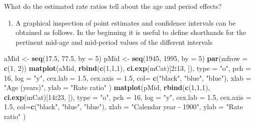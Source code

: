 \documentclass[
]{book}
\newenvironment{Shaded}{\begin{snugshade}}{\end{snugshade}}
\newcommand{\AttributeTok}[1]{\textcolor[rgb]{0.13,0.29,0.53}{#1}}
\newcommand{\DecValTok}[1]{\textcolor[rgb]{0.00,0.00,0.81}{#1}}
\newcommand{\FloatTok}[1]{\textcolor[rgb]{0.00,0.00,0.81}{#1}}
\newcommand{\FunctionTok}[1]{\textcolor[rgb]{0.13,0.29,0.53}{\textbf{#1}}}
\newcommand{\NormalTok}[1]{#1}
\newcommand{\OtherTok}[1]{\textcolor[rgb]{0.56,0.35,0.01}{#1}}
\newcommand{\SpecialCharTok}[1]{\textcolor[rgb]{0.81,0.36,0.00}{\textbf{#1}}}
\newcommand{\StringTok}[1]{\textcolor[rgb]{0.31,0.60,0.02}{#1}}
\providecommand{\tightlist}{%
  \setlength{\itemsep}{0pt}\setlength{\parskip}{0pt}}
\begin{document}
What do the estimated rate ratios tell about the age and period effects?

\begin{enumerate}
\def\labelenumi{\arabic{enumi}.}
\setcounter{enumi}{1}
\tightlist
\item
  A graphical inspection of point estimates and confidence
  intervals can be obtained as follows. In the beginning it is useful
  to define shorthands for the pertinent mid-age and mid-period values
  of the different intervals
\end{enumerate}

\begin{Shaded}
\begin{Highlighting}[]
\NormalTok{aMid }\OtherTok{\textless{}{-}} \FunctionTok{seq}\NormalTok{(}\FloatTok{17.5}\NormalTok{, }\FloatTok{77.5}\NormalTok{, }\AttributeTok{by =} \DecValTok{5}\NormalTok{)}
\NormalTok{pMid }\OtherTok{\textless{}{-}} \FunctionTok{seq}\NormalTok{(}\DecValTok{1945}\NormalTok{, }\DecValTok{1995}\NormalTok{, }\AttributeTok{by =} \DecValTok{5}\NormalTok{)}
\FunctionTok{par}\NormalTok{(}\AttributeTok{mfrow =} \FunctionTok{c}\NormalTok{(}\DecValTok{1}\NormalTok{, }\DecValTok{2}\NormalTok{))}
\FunctionTok{matplot}\NormalTok{(aMid, }\FunctionTok{rbind}\NormalTok{(}\FunctionTok{c}\NormalTok{(}\DecValTok{1}\NormalTok{,}\DecValTok{1}\NormalTok{,}\DecValTok{1}\NormalTok{), }\FunctionTok{ci.exp}\NormalTok{(mCat)[}\DecValTok{2}\SpecialCharTok{:}\DecValTok{13}\NormalTok{, ]), }\AttributeTok{type =} \StringTok{"o"}\NormalTok{, }\AttributeTok{pch =} \DecValTok{16}\NormalTok{,     }
   \AttributeTok{log =} \StringTok{"y"}\NormalTok{, }\AttributeTok{cex.lab =} \FloatTok{1.5}\NormalTok{, }\AttributeTok{cex.axis =} \FloatTok{1.5}\NormalTok{, }\AttributeTok{col=} \FunctionTok{c}\NormalTok{(}\StringTok{"black"}\NormalTok{, }\StringTok{"blue"}\NormalTok{, }\StringTok{"blue"}\NormalTok{),}
  \AttributeTok{xlab =} \StringTok{"Age (years)"}\NormalTok{, }\AttributeTok{ylab =} \StringTok{"Rate ratio"}\NormalTok{ )}
\FunctionTok{matplot}\NormalTok{(pMid, }\FunctionTok{rbind}\NormalTok{(}\FunctionTok{c}\NormalTok{(}\DecValTok{1}\NormalTok{,}\DecValTok{1}\NormalTok{,}\DecValTok{1}\NormalTok{), }\FunctionTok{ci.exp}\NormalTok{(mCat)[}\DecValTok{14}\SpecialCharTok{:}\DecValTok{23}\NormalTok{, ]), }\AttributeTok{type =} \StringTok{"o"}\NormalTok{, }\AttributeTok{pch =} \DecValTok{16}\NormalTok{,}
  \AttributeTok{log =} \StringTok{"y"}\NormalTok{, }\AttributeTok{cex.lab =} \FloatTok{1.5}\NormalTok{, }\AttributeTok{cex.axis =} \FloatTok{1.5}\NormalTok{, }\AttributeTok{col=}\FunctionTok{c}\NormalTok{(}\StringTok{"black"}\NormalTok{, }\StringTok{"blue"}\NormalTok{, }\StringTok{"blue"}\NormalTok{),}
  \AttributeTok{xlab =} \StringTok{"Calendar year {-} 1900"}\NormalTok{, }\AttributeTok{ylab =} \StringTok{"Rate ratio"}\NormalTok{ )}
\end{Highlighting}
\end{Shaded}
\end{document}
